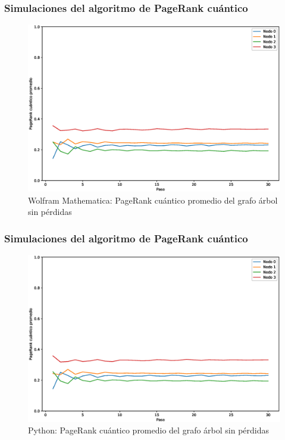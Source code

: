 \documentclass[xetex,mathserif,serif, 8pt]{beamer}
\begin{document}
\begin{frame}
    \frametitle{Simulaciones del algoritmo de PageRank cuántico}

    \begin{figure}[H]
        \centering
        \includegraphics[width=0.9\linewidth]{img/tree-mean-M.eps}
        \caption{Wolfram Mathematica: PageRank cuántico promedio del grafo árbol sin pérdidas}
    \end{figure}

\end{frame}

\begin{frame}
    \frametitle{Simulaciones del algoritmo de PageRank cuántico}

    \begin{figure}[H]
        \centering
        \includegraphics[width=0.9\linewidth]{img/tree-mean-lossless.eps}
        \caption{Python: PageRank cuántico promedio del grafo árbol sin pérdidas}
\end{figure}

\end{frame}
\end{document}
